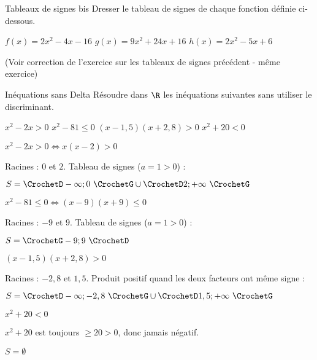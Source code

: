 \def\rdifficulty{2}
\begin{EXO}{Tableaux de signes bis}{}
Dresser le tableau de signes de chaque fonction définie ci-dessous.
\begin{tcbenumerate}[3]
\tcbitem {} $f(x)=2x^2-4x-16$
\tcbitem {} $g(x)=9x^2+24x+16$
\tcbitem {} $h(x)=2x^2-5x+6$\\
\end{tcbenumerate}

\exocorrection

(Voir correction de l'exercice sur les tableaux de signes précédent - même exercice)
\end{EXO}

\def\rdifficulty{1.5}
\begin{EXO}{Inéquations sans Delta}{}
Résoudre dans $\R$ les inéquations suivantes sans utiliser le discriminant.
\begin{tcbenumerate}[4]
\tcbitem {} $x^2-2x>0$
\tcbitem {} $x^2-81\leqslant 0$
\tcbitem {} $(x-1,5)(x+2,8)>0$
\tcbitem {} $x^2+20<0$\\
\end{tcbenumerate}

\exocorrection

\begin{tcbenumerate}[1]
\tcbitem $x^2-2x>0 \Leftrightarrow x(x-2)>0$

Racines : $0$ et $2$. Tableau de signes ($a=1>0$) :

$S = \CrochetD-\infty;0\,\,\CrochetG \cup \CrochetD2;+\infty\,\,\CrochetG$

\tcbitem $x^2-81\leqslant 0 \Leftrightarrow (x-9)(x+9)\leqslant 0$

Racines : $-9$ et $9$. Tableau de signes ($a=1>0$) :

$S = \CrochetG-9;9\,\,\CrochetD$

\tcbitem $(x-1,5)(x+2,8)>0$

Racines : $-2,8$ et $1,5$. Produit positif quand les deux facteurs ont même signe :

$S = \CrochetD-\infty;-2,8\,\,\CrochetG \cup \CrochetD1,5;+\infty\,\,\CrochetG$

\tcbitem $x^2+20<0$

$x^2+20$ est toujours $\geq 20 > 0$, donc jamais négatif.

$S = \emptyset$
\end{tcbenumerate}
\end{EXO}

